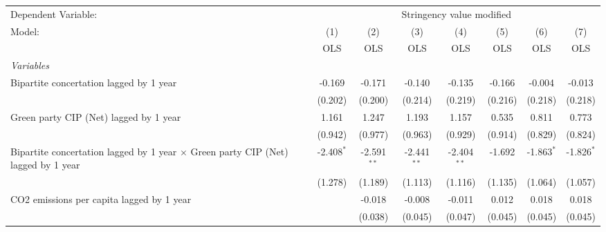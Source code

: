 
\begingroup
\centering
\begin{tabular}{lccccccc}
   \toprule
   Dependent Variable: & \multicolumn{7}{c}{Stringency value modified}\\
   Model:                                                                                   & (1)          & (2)           & (3)           & (4)           & (5)          & (6)          & (7)\\  
                                                                                            &  OLS         & OLS           & OLS           & OLS           & OLS          & OLS          & OLS\\  
   \midrule
   \emph{Variables}\\
   Bipartite concertation lagged by 1 year                                                  & -0.169       & -0.171        & -0.140        & -0.135        & -0.166       & -0.004       & -0.013\\   
                                                                                            & (0.202)      & (0.200)       & (0.214)       & (0.219)       & (0.216)      & (0.218)      & (0.218)\\   
   Green party CIP (Net) lagged by 1 year                                                   & 1.161        & 1.247         & 1.193         & 1.157         & 0.535        & 0.811        & 0.773\\   
                                                                                            & (0.942)      & (0.977)       & (0.963)       & (0.929)       & (0.914)      & (0.829)      & (0.824)\\   
   Bipartite concertation lagged by 1 year $\times$ Green party CIP (Net) lagged by 1 year  & -2.408$^{*}$ & -2.591$^{**}$ & -2.441$^{**}$ & -2.404$^{**}$ & -1.692       & -1.863$^{*}$ & -1.826$^{*}$\\   
                                                                                            & (1.278)      & (1.189)       & (1.113)       & (1.116)       & (1.135)      & (1.064)      & (1.057)\\   
   CO2 emissions per capita lagged by 1 year                                                &              & -0.018        & -0.008        & -0.011        & 0.012        & 0.018        & 0.018\\   
                                                                                            &              & (0.038)       & (0.045)       & (0.047)       & (0.045)      & (0.045)      & (0.045)\\   

\end{tabular}
